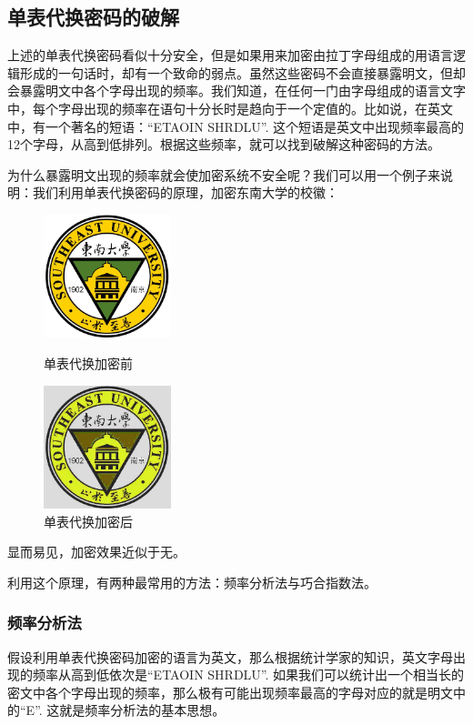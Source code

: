 \subsection{单表代换密码的破解}
上述的单表代换密码看似十分安全，但是如果用来加密由拉丁字母组成的用语言逻辑形成的一句话时，却有一个致命的弱点。虽然这些密码不会直接暴露明文，但却会暴露明文中各个字母出现的频率。我们知道，在任何一门由字母组成的语言文字中，每个字母出现的频率在语句十分长时是趋向于一个定值的。比如说，在英文中，有一个著名的短语：``ETAOIN SHRDLU''. 这个短语是英文中出现频率最高的12个字母，从高到低排列。根据这些频率，就可以找到破解这种密码的方法。\par
为什么暴露明文出现的频率就会使加密系统不安全呢？我们可以用一个例子来说明：我们利用单表代换密码的原理，加密东南大学的校徽：
\begin{figure}[H]
\centering
\begin{minipage}[t]{0.49\textwidth}
\centering
\includegraphics[width=10em]{chapters/chapter_1/Caesar_origin.jpg}
\caption{单表代换加密前}
\end{minipage}
\begin{minipage}[t]{0.49\textwidth}
\centering
\includegraphics[width=10em]{chapters/chapter_1/Caesar_result.jpg}
\caption{单表代换加密后}
\end{minipage}
\end{figure}

显而易见，加密效果近似于无。\par
利用这个原理，有两种最常用的方法：频率分析法与巧合指数法。
\subsubsection{频率分析法}
假设利用单表代换密码加密的语言为英文，那么根据统计学家的知识，英文字母出现的频率从高到低依次是``ETAOIN SHRDLU''. 如果我们可以统计出一个相当长的密文中各个字母出现的频率，那么极有可能出现频率最高的字母对应的就是明文中的``E''. 这就是频率分析法的基本思想。
